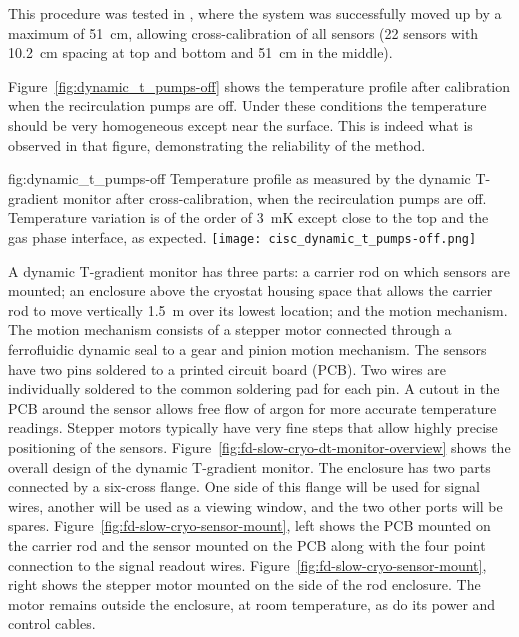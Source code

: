 This procedure was tested in , where the system was successfully moved up by a maximum of \SI{51}{cm}, allowing cross-calibration of all sensors (22 sensors with \SI{10.2}{cm} spacing at top and bottom and \SI{51}{cm} in the middle). 

Figure~\ref{fig:dynamic_t_pumps-off} shows the temperature profile after calibration when the recirculation pumps are off. Under these conditions the  temperature should be very homogeneous except near the surface. This is indeed what is observed in that figure, demonstrating the reliability of the method.  

\begin{dunefigure}{fig:dynamic_t_pumps-off}
  {Temperature profile as measured by the dynamic T-gradient monitor after cross-calibration, when the recirculation pumps are off. Temperature variation is of the order of \SI{3}{mK} except close to the top and the gas phase interface, as expected.}
  \texttt{[image: cisc\_dynamic\_t\_pumps-off.png]}%
\end{dunefigure}


A dynamic T-gradient monitor has three parts: a carrier rod on which sensors are mounted; an enclosure above the cryostat housing space that allows the carrier rod to move vertically  \SI{1.5}{m} over its lowest location; and the motion mechanism. The motion mechanism consists of a stepper motor connected through a ferrofluidic dynamic seal to a gear and pinion motion mechanism. The sensors have two pins soldered to a printed circuit board (PCB). 
Two wires are individually soldered to the common soldering pad for each pin.  A cutout in the PCB around the sensor allows free flow of argon for more accurate temperature readings.  Stepper motors typically have very fine steps that allow highly precise positioning of the sensors.  Figure~\ref{fig:fd-slow-cryo-dt-monitor-overview} shows the overall design of the dynamic T-gradient monitor. %
The enclosure has two parts connected by a six-cross flange. One side of this flange will be used for signal wires, another will be used as a viewing window, and the two other ports will be spares. Figure~\ref{fig:fd-slow-cryo-sensor-mount}, left shows the PCB mounted on the carrier rod and the sensor mounted on the PCB along with the four point connection to the signal readout wires. %
Figure~\ref{fig:fd-slow-cryo-sensor-mount}, right shows the stepper motor mounted on the side of the rod enclosure. The motor remains outside the enclosure, at room temperature, %
as do its power and control cables. %


